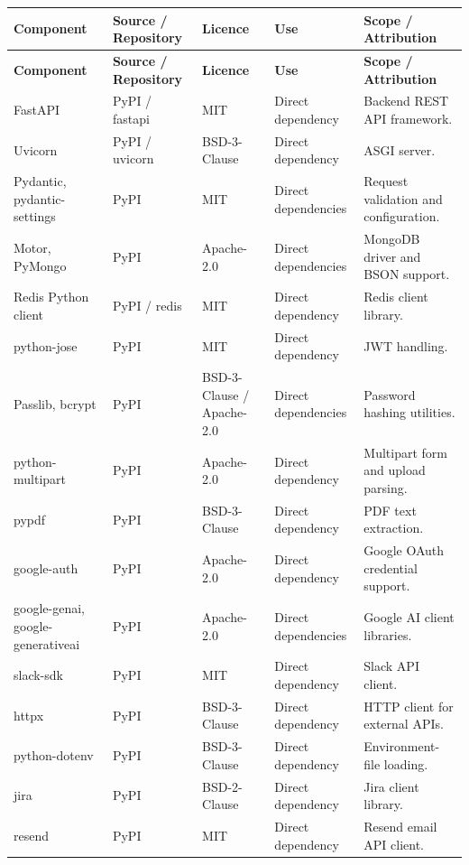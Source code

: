 \documentclass[11pt,a4paper]{article}
\begin{document}
{\small
\begin{longtable}{@{}p{3.1cm}p{3.5cm}p{2.1cm}p{1.5cm}p{5.1cm}@{}}
\toprule
\textbf{Component} & \textbf{Source / Repository} & \textbf{Licence} & \textbf{Use} & \textbf{Scope / Attribution} \\
\midrule
\endfirsthead
\toprule
\textbf{Component} & \textbf{Source / Repository} & \textbf{Licence} & \textbf{Use} & \textbf{Scope / Attribution} \\
\midrule
\endhead
\bottomrule
\endfoot
FastAPI & PyPI / fastapi & MIT & Direct dependency & Backend REST API framework. \\
\midrule
Uvicorn & PyPI / uvicorn & BSD-3-Clause & Direct dependency & ASGI server. \\
\midrule
Pydantic, pydantic-settings & PyPI & MIT & Direct dependencies & Request validation and configuration. \\
\midrule
Motor, PyMongo & PyPI & Apache-2.0 & Direct dependencies & MongoDB driver and BSON support. \\
\midrule
Redis Python client & PyPI / redis & MIT & Direct dependency & Redis client library. \\
\midrule
python-jose & PyPI & MIT & Direct dependency & JWT handling. \\
\midrule
Passlib, bcrypt & PyPI & BSD-3-Clause / Apache-2.0 & Direct dependencies & Password hashing utilities. \\
\midrule
python-multipart & PyPI & Apache-2.0 & Direct dependency & Multipart form and upload parsing. \\
\midrule
pypdf & PyPI & BSD-3-Clause & Direct dependency & PDF text extraction. \\
\midrule
google-auth & PyPI & Apache-2.0 & Direct dependency & Google OAuth credential support. \\
\midrule
google-genai, google-generativeai & PyPI & Apache-2.0 & Direct dependencies & Google AI client libraries. \\
\midrule
slack-sdk & PyPI & MIT & Direct dependency & Slack API client. \\
\midrule
httpx & PyPI & BSD-3-Clause & Direct dependency & HTTP client for external APIs. \\
\midrule
python-dotenv & PyPI & BSD-3-Clause & Direct dependency & Environment-file loading. \\
\midrule
jira & PyPI & BSD-2-Clause & Direct dependency & Jira client library. \\
\midrule
resend & PyPI & MIT & Direct dependency & Resend email API client. \\

\end{longtable}}
\end{document}
